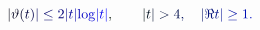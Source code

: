 \documentclass[12pt]{article}
\begin{document}
\makeatletter
\renewcommand*{\@textcolor}[3]{%
  \protect\leavevmode
  \begingroup
    \color#1{#2}#3%
  \endgroup
}
\makeatother
\begin{displaymath}
\mathcolor[RGB]{0,0,15}{|} \mathcolor[RGB]{0,0,30}{\vartheta} \mathcolor[RGB]{0,0,45}{(} \mathcolor[RGB]{0,0,60}{t} \mathcolor[RGB]{0,0,75}{)} \mathcolor[RGB]{0,0,90}{|} \mathcolor[RGB]{0,0,105}{\le} \mathcolor[RGB]{0,0,120}{2} \mathcolor[RGB]{0,0,135}{|} \mathcolor[RGB]{0,0,150}{t} \mathcolor[RGB]{0,0,165}{|} \mathrm { \mathcolor[RGB]{0,0,180}{l} \mathcolor[RGB]{0,0,195}{o} \mathcolor[RGB]{0,0,210}{g} } \mathcolor[RGB]{0,0,225}{|} \mathcolor[RGB]{0,0,240}{t} \mathcolor[RGB]{0,0,255}{|} \mathcolor[RGB]{0,15,0}{,} \qquad \mathcolor[RGB]{0,15,15}{|} \mathcolor[RGB]{0,15,30}{t} \mathcolor[RGB]{0,15,45}{|} \mathcolor[RGB]{0,15,60}{>} \mathcolor[RGB]{0,15,75}{4} \mathcolor[RGB]{0,15,90}{,} \quad \mathcolor[RGB]{0,15,105}{|} \mathcolor[RGB]{0,15,120}{\Re} \mathcolor[RGB]{0,15,135}{t} \mathcolor[RGB]{0,15,150}{|} \mathcolor[RGB]{0,15,165}{\ge} \mathcolor[RGB]{0,15,180}{1} \mathcolor[RGB]{0,15,195}{.}
\end{displaymath}
\end{document}

